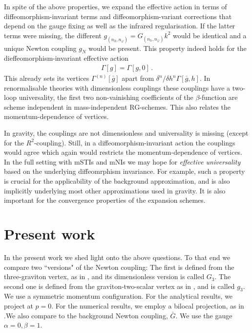 \documentclass[11pt]{book} %
\begin{document}
In spite of the above properties, we expand the effective action in
terms of diffeomorphism-invariant terms and diffeomorphism-variant
corrections that depend on the gauge fixing as well as the infrared
regularisation. If the latter terms were missing, the different
$g_{(n_h,n_\varphi)}=G_{(n_h,n_\varphi)} k^2$ would be identical and a
unique Newton coupling $g_N$ would be present. This property indeed
holds for the dieffeomorphism-invariant effective action
\begin{align}
\Gamma[g]= \Gamma[g,0]\,.
\end{align}
This already sets its vertices $\Gamma^{(n)}[\bar g]$ apart from
$\delta^n/\delta h^n \Gamma[\bar g,h]$. In renormalisable theories with
dimensionless couplings these couplings have a two-loop universality,
the first two non-vainishing coefficients of the $\beta$-function are
scheme independent in mass-independent RG-schemes. This also relates
the momentum-dependence of vertices.

In gravity, the couplings are not dimensionless and universality is
missing (except for the $R^2$-coupling). Still, in a
diffeomorphism-invariant action the couplings would agree which again
would restricts the momentum-dependence of vertices. In the full
setting with mSTIs and mNIs we may hope for {\it effective
  universality} based on the underlying diffeomrphism invariance. For
example, such a property is crucial for the applicability of the
background approximation, and is also implicitly underlying most other
approximations used in gravity. It is also important for the
convergence properties of the expansion schemes.


\section{Present work}

In the present work we shed light onto the above questions. To that end
we compare two ``versions" of the Newton coupling: The first is
defined from the three-graviton vertex, as in
\cite{Christiansen:2015rva,Meibohm:2015twa}, and its dimensionless
version is called $G_3$. The second one is defined from the
graviton-two-scalar vertex as in \cite{Dona:2015tnf}, and is called
$g_3$. We use a symmetric momentum configuration. For the analytical
results, we project at $p=0$. For the numerical results, we employ a
bilocal projection, as in
\cite{Christiansen:2015rva,Meibohm:2015twa}.\newline We also compare
to the background Newton coupling, $\bar{G}$. We use the gauge
$\alpha=0, \beta=1$.
\end{document}
